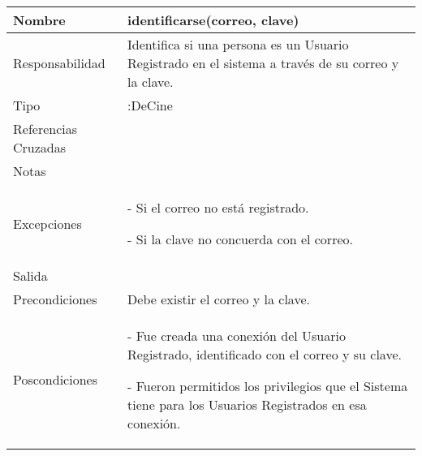 \documentclass{article}
\begin{document}
\begin{table}[h]
\begin{tabular}{|l|l|l|l|l|l|}
\hline
\multicolumn{2}{|p{3cm}|}{Nombre} & \multicolumn{3}{p{8cm}|}{\textbf{identificarse(correo, clave)}}\\
\hline
\multicolumn{2}{|p{3cm}|}{Responsabilidad} & \multicolumn{4}{p{8cm}|}{Identifica si una persona es un Usuario Registrado en el sistema a través de su correo y la clave.} \\
\hline
\multicolumn{2}{|p{3cm}|}{Tipo} & \multicolumn{4}{p{8cm}|}{:DeCine} \\
\hline
\multicolumn{2}{|p{3cm}|}{Referencias Cruzadas} & \multicolumn{4}{p{8cm}|}{} \\
\hline
\multicolumn{2}{|p{3cm}|}{Notas} & \multicolumn{4}{p{8cm}|}{} \\
\hline
\multicolumn{2}{|p{3cm}|}{Excepciones} & \multicolumn{4}{p{8cm}|}{- Si el correo no está registrado.

- Si la clave no concuerda con el correo.
} \\
\hline
\multicolumn{2}{|p{3cm}|}{Salida} & \multicolumn{4}{p{8cm}|}{} \\
\hline
\multicolumn{2}{|p{3cm}|}{Precondiciones} & \multicolumn{4}{p{8cm}|}{Debe existir el correo y la clave.} \\
\hline
\multicolumn{2}{|p{3cm}|}{Poscondiciones} & \multicolumn{4}{p{8cm}|}{- Fue creada una conexión del Usuario Registrado, identificado con el correo y su clave.

- Fueron permitidos los privilegios que el Sistema tiene para los Usuarios Registrados en esa conexión.
} \\
\hline
\end{tabular}
\end{table}
\end{document}
